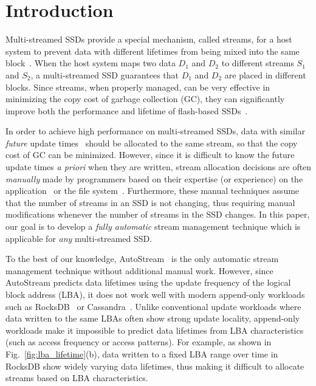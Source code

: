 \vspace{-10pt}
\section{Introduction}
\label{sec:intro}
\vspace{-3pt}
Multi-streamed SSDs provide a special mechanism,
called streams, for a host system to prevent data with different lifetimes 
from being mixed into the same block~\cite{T10, MultiStream}.
When the host system maps two data $D_1$ and $D_2$ to 
different streams $S_1$ and $S_2$, a multi-streamed SSD guarantees that 
$D_1$ and $D_2$ are placed in different blocks.   
Since streams, when properly managed, can be very effective in minimizing 
the copy cost of garbage collection (GC), they
can significantly improve both the performance and lifetime of 
flash-based SSDs~\cite{MultiStream, Level, FStream, AutoStream}.

In order to achieve high performance on multi-streamed SSDs, data with similar 
{\it future} update times~\cite{PCHa}
should be allocated 
to the same stream, so that the copy cost of GC can be minimized.
However, since it is difficult to know the future update times {\it a priori} when they are written,
stream allocation decisions are often {\it manually} made 
by programmers based on their expertise (or experience) 
on the application~\cite{MultiStream, Level} or the file system~\cite{FStream}.  
Furthermore, these manual techniques assume 
that the number of streams in an SSD is not changing, 
thus requiring manual modifications whenever the number of streams in the SSD changes.
In this paper, our goal is to develop 
a {\it fully automatic} stream management technique which is applicable for {\it any} multi-streamed SSD. %

To the best of our knowledge, \textsf{\small AutoStream}~\cite{AutoStream} is the only automatic 
stream management technique
without additional manual work.  
However, since \textsf{\small AutoStream} predicts data lifetimes using the update frequency 
of the logical block address (LBA), it does not work well with modern append-only workloads 
such as RocksDB~\cite{RocksDB} or Cassandra~\cite{Cassandra}.  
Unlike conventional update workloads where data written to the same LBAs 
often show strong update locality, 
append-only workloads make it impossible to predict data lifetimes 
from LBA characteristics (such as access frequency or access patterns).  
For example, as shown in Fig.~\ref{fig:lba_lifetime}(b), 
data written to a fixed LBA range over time in RocksDB 
show widely varying data lifetimes, 
thus making it difficult to allocate streams based on LBA characteristics.

